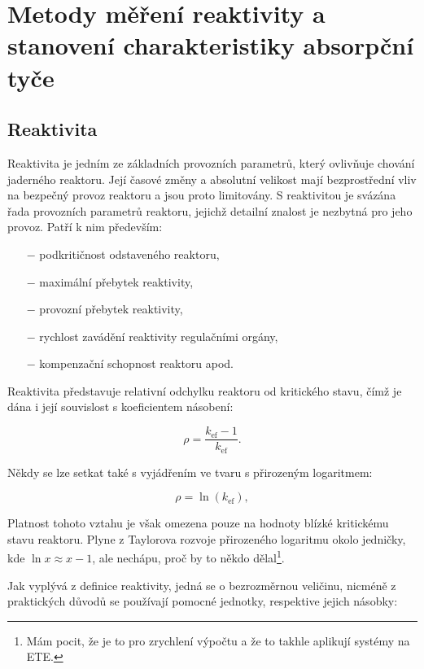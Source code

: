 \section[Měření reaktivity]{Metody měření reaktivity a stanovení charakteristiky absorpční tyče}

\subsection{Reaktivita}

Reaktivita je jedním ze základních provozních parametrů, který ovlivňuje chování jaderného reaktoru. Její časové změny a absolutní velikost mají bezprostřední vliv na bezpečný provoz reaktoru a jsou proto limitovány. S reaktivitou je svázána řada provozních parametrů reaktoru, jejichž detailní znalost je nezbytná pro jeho provoz. Patří k nim především:

\begin{itemize}%
    \item[$-$] podkritičnost odstaveného reaktoru,
    \item[$-$] maximální přebytek reaktivity,
    \item[$-$] provozní přebytek reaktivity,
    \item[$-$] rychlost zavádění reaktivity regulačními orgány,
    \item[$-$] kompenzační schopnost reaktoru apod.
\end{itemize}

Reaktivita představuje relativní odchylku reaktoru od kritického stavu, čímž je dána i její souvislost s koeficientem násobení:

\begin{equation}
    \boxed{\rho = \frac{k_{\text{ef}} - 1}{k_{\text{ef}}}.}
\end{equation}

Někdy se lze setkat také s vyjádřením ve tvaru s přirozeným logaritmem:

\begin{equation}
    \rho = \ln(k_{\text{ef}}),
\end{equation}

Platnost tohoto vztahu je však omezena pouze na hodnoty blízké kritickému stavu reaktoru. Plyne z Taylorova rozvoje přirozeného logaritmu okolo jedničky, kde $\ln{x} \approx x - 1$, ale nechápu, proč by to někdo dělal\footnote{Mám pocit, že je to pro zrychlení výpočtu a že to takhle aplikují systémy na ETE.}.

Jak vyplývá z definice reaktivity, jedná se o bezrozměrnou veličinu, nicméně z praktických důvodů se používají pomocné jednotky, respektive jejich násobky:

